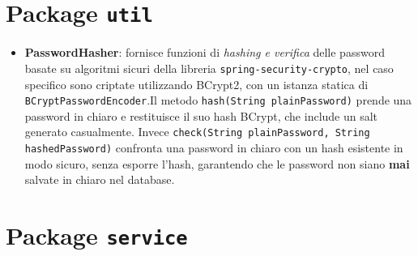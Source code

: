\documentclass[
  italian,
  paper=a4,
  ,captions=tableheading
]{scrbook}
\newcommand{\passthrough}[1]{#1}
\providecommand{\tightlist}{%
  \setlength{\itemsep}{0pt}\setlength{\parskip}{0pt}}
\begin{document}
\section{\texorpdfstring{Package
\texttt{util}}{Package util}}\label{package-util}

\begin{itemize}
\tightlist
\item
  \textbf{PasswordHasher}: fornisce funzioni di \emph{hashing e
  verifica} delle password basate su algoritmi sicuri della libreria
  \passthrough{\lstinline!spring-security-crypto!}, nel caso specifico
  sono criptate utilizzando BCrypt2, con un istanza statica di
  \passthrough{\lstinline!BCryptPasswordEncoder!}.Il metodo
  \passthrough{\lstinline!hash(String plainPassword)!} prende una
  password in chiaro e restituisce il suo hash BCrypt, che include un
  salt generato casualmente. Invece
  \passthrough{\lstinline!check(String plainPassword, String hashedPassword)!}
  confronta una password in chiaro con un hash esistente in modo sicuro,
  senza esporre l'hash, garantendo che le password non siano
  \textbf{mai} salvate in chiaro nel database.
\end{itemize}

\section{\texorpdfstring{Package
\texttt{service}}{Package service}}\label{package-service}
\end{document}
